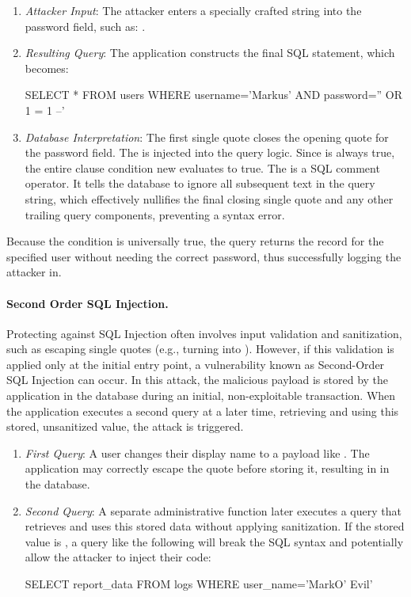 \begin{enumerate}
    \item \textit{Attacker Input}: The attacker enters a specially crafted string into the password field, such as: .
    \item \textit{Resulting Query}: The application constructs the final SQL statement, which becomes:
          \begin{sqlcode}
              SELECT * FROM users WHERE username='Markus' AND password='' OR 1 = 1 --'
          \end{sqlcode}
    \item \textit{Database Interpretation}: The first single quote closes the opening quote for the password field. The  is injected into the query logic. Since  is always true, the entire  clause condition new evaluates to true. The \NewTexttt{--} is a SQL comment operator. It tells the database to ignore all subsequent text in the query string, which effectively nullifies the final closing single quote and any other trailing query components, preventing a syntax error.
\end{enumerate}

Because the  condition is universally true, the query returns the record for the specified user without needing the correct password, thus successfully logging the attacker in.

\paragraph{Second Order SQL Injection.} Protecting against SQL Injection often involves input validation and sanitization, such as escaping single quotes (e.g., turning  into ). However, if this validation is applied only at the initial entry point, a vulnerability known as Second-Order SQL Injection can occur. In this attack, the malicious payload is stored by the application in the database during an initial, non-exploitable transaction. When the application executes a second query at a later time, retrieving and using this stored, unsanitized value, the attack is triggered.

\begin{enumerate}
    \item \textit{First Query}: A user changes their display name to a payload like . The application may correctly escape the quote before storing it, resulting in  in the database.
    \item \textit{Second Query}: A separate administrative function later executes a query that retrieves and uses this stored data without applying sanitization. If the stored value is , a query like the following will break the SQL syntax and potentially allow the attacker to inject their code:
          \begin{sqlcode}
              SELECT report_data FROM logs WHERE user_name='MarkO' Evil'
          \end{sqlcode}
\end{enumerate}

